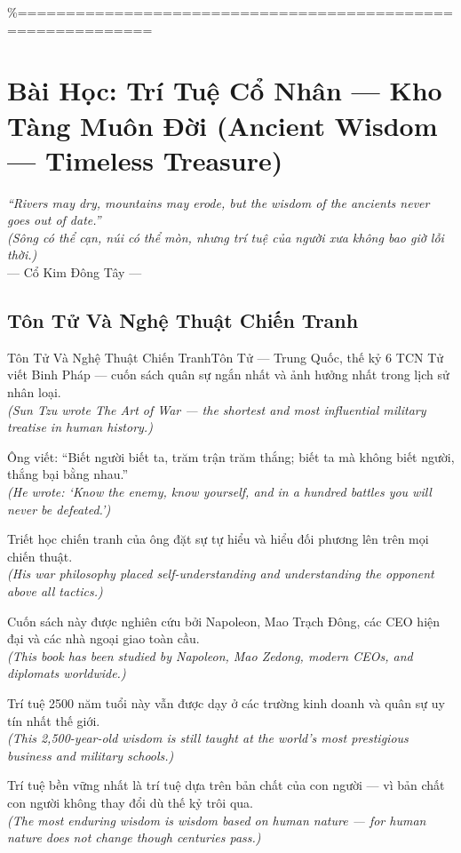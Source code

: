 \%============================================================
\chapter{Bài Học: Trí Tuệ Cổ Nhân --- Kho Tàng Muôn Đời (Ancient Wisdom --- Timeless Treasure)}
\begin{center}
  \textit{\color{truyengold}``Rivers may dry, mountains may erode, but the wisdom of the ancients never goes out of date.''}\\[4pt]
  \textit{(Sông có thể cạn, núi có thể mòn, nhưng trí tuệ của người xưa không bao giờ lỗi thời.)}\\[4pt]
  \small\color{truyenblue}--- Cổ Kim Đông Tây ---
\end{center}
\ngancach

\section{Tôn Tử Và Nghệ Thuật Chiến Tranh}
\begin{truyen}{Tôn Tử Và Nghệ Thuật Chiến Tranh}{Tôn Tử --- Trung Quốc, thế kỷ 6 TCN}
 Tử viết Binh Pháp --- cuốn sách quân sự ngắn nhất và ảnh hưởng nhất trong lịch sử nhân loại.\\[4pt]
\textit{(Sun Tzu wrote The Art of War --- the shortest and most influential military treatise in human history.)}

Ông viết: ``Biết người biết ta, trăm trận trăm thắng; biết ta mà không biết người, thắng bại bằng nhau.''\\[4pt]
\textit{(He wrote: `Know the enemy, know yourself, and in a hundred battles you will never be defeated.')}

Triết học chiến tranh của ông đặt sự tự hiểu và hiểu đối phương lên trên mọi chiến thuật.\\[4pt]
\textit{(His war philosophy placed self-understanding and understanding the opponent above all tactics.)}

Cuốn sách này được nghiên cứu bởi Napoleon, Mao Trạch Đông, các CEO hiện đại và các nhà ngoại giao toàn cầu.\\[4pt]
\textit{(This book has been studied by Napoleon, Mao Zedong, modern CEOs, and diplomats worldwide.)}

Trí tuệ 2500 năm tuổi này vẫn được dạy ở các trường kinh doanh và quân sự uy tín nhất thế giới.\\[4pt]
\textit{(This 2,500-year-old wisdom is still taught at the world's most prestigious business and military schools.)}

\end{truyen}
\begin{baihoc}
  Trí tuệ bền vững nhất là trí tuệ dựa trên bản chất của con người --- vì bản chất con người không thay đổi dù thế kỷ trôi qua.\\[4pt]
  \textit{(The most enduring wisdom is wisdom based on human nature --- for human nature does not change though centuries pass.)}
\end{baihoc}

